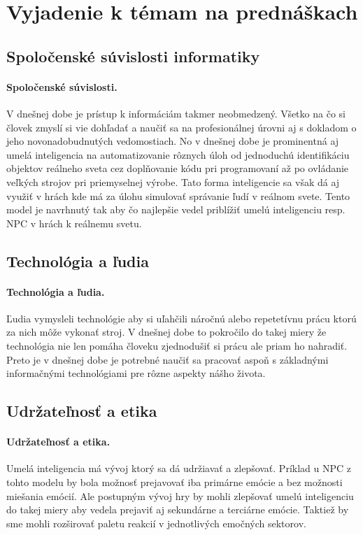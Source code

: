 \documentclass[10pt,oneside,slovak,a4paper]{article}
\begin{document}
\section{Vyjadenie k témam na prednáškach}

\subsection{Spoločenské súvislosti informatiky}

\paragraph{Spoločenské súvislosti.}  V dnešnej dobe je prístup k informáciám takmer neobmedzený.
Všetko na čo si človek zmyslí si vie dohľadať a naučiť sa na profesionálnej úrovni aj s dokladom
o jeho novonadobudnutých vedomostiach. No v dnešnej dobe je prominentná aj umelá inteligencia na
automatizovanie rôznych úloh od jednoduchú identifikáciu objektov reálneho sveta cez doplňovanie
kódu pri programovaní až po ovládanie veľkých strojov pri priemyselnej výrobe. Tato forma inteligencie
sa však dá aj využiť v hrách kde má za úlohu simulovať správanie ľudí v reálnom svete. Tento model je
navrhnutý tak aby čo najlepšie vedel priblížiť umelú inteligenciu resp. NPC v hrách k reálnemu svetu.

\subsection{Technológia a ľudia}

\paragraph{Technológia a ľudia.} Ľudia vymysleli technológie aby si uľahčili náročnú alebo repetetívnu
prácu ktorú za nich môže vykonať stroj. V dnešnej dobe to pokročilo do takej miery že technológia nie len
pomáha človeku zjednodušiť si prácu ale priam ho nahradiť. Preto je v dnešnej dobe je potrebné naučiť sa
pracovať aspoň s základnými informačnými technológiami pre rôzne aspekty nášho života.

\subsection{Udržateľnosť a etika}

\paragraph{Udržateľnosť a etika.} Umelá inteligencia má vývoj ktorý sa dá udržiavať a zlepšovať.
Príklad u NPC z tohto modelu by bola možnosť prejavovať iba primárne emócie a bez možnosti miešania
emócií. Ale postupným vývoj hry by mohli zlepšovať umelú inteligenciu do takej miery aby vedela prejaviť
aj sekundárne a terciárne emócie. Taktiež by sme mohli rozširovať paletu reakcií v jednotlivých emočných
sektorov.


 
\end{document}
